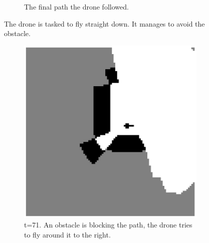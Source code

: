 \begin{figure}
\begin{subfigure}[t]{0.24\textwidth}
\caption{The final path the drone followed. }
\label{fig:squeeze_final}
\end{subfigure}
\caption{The drone is tasked to fly straight down. It manages to avoid the obstacle.}
\label{fig:squeeze}
\end{figure}

\begin{figure}
\begin{subfigure}[t]{0.3\textwidth}
\includegraphics[width=\textwidth]{Figures/convex_corner/t71_trying_fly_around.eps}
\caption{t=71. An obstacle is blocking the path, the drone tries to fly around it to the right.}
\label{fig:convex_corner1}
\end{subfigure}
\,
\begin{subfigure}[t]{0.3\textwidth}

\end{subfigure}
\end{figure}
